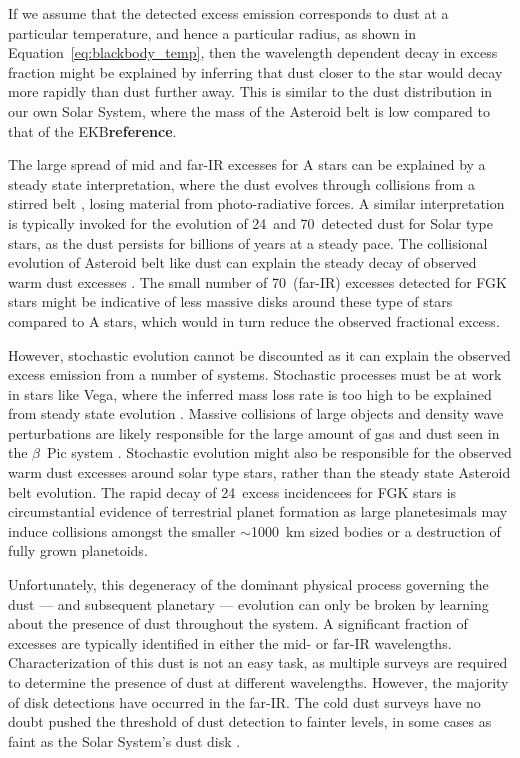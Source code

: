     If we assume that the detected excess emission corresponds to dust at a particular temperature, and hence a particular radius, as shown in Equation~\ref{eq:blackbody_temp}, then the wavelength dependent decay in excess fraction might be explained by inferring that dust closer to the star would decay more rapidly than dust further away. This is similar to the dust distribution in our own Solar System, where the mass of the Asteroid belt is low compared to that of the EKB\textbf{reference}. 
    
    The large spread of mid and far-IR excesses for A stars can be explained by a steady state interpretation, where the dust evolves through collisions from a stirred belt \citep{Su2006, Wyatt2008}, losing material from photo-radiative forces. A similar interpretation is typically invoked for the evolution of 24\micron\ and 70\micron\ detected dust for Solar type stars, as the dust persists for billions of years at a steady pace. The collisional evolution of Asteroid belt like dust can explain the steady decay of observed warm dust excesses \citep{Wyatt2008}. The small number of 70\micron\ (far-IR) excesses detected for FGK stars might be indicative of less massive disks around these type of stars compared to A stars, which would in turn reduce the observed fractional excess\citep{Wyatt2008}. 
    
    However, stochastic evolution cannot be discounted as it can explain the observed excess emission from a number of systems. Stochastic processes must be at work in stars like Vega, where the inferred mass loss rate is too high to be explained from steady state evolution \citep{Su2006}. Massive collisions of large objects and density wave perturbations are likely responsible for the large amount of gas and dust seen in the $\beta$~Pic system \citep{Telesco2005, Nesvold2015}. Stochastic  evolution might also be responsible for the observed warm dust excesses around solar type stars, rather than the steady state Asteroid belt evolution. The rapid decay of 24\micron\ excess incidencees for FGK stars is circumstantial evidence of terrestrial planet formation as large planetesimals may induce collisions amongst the smaller $\sim$1000~km sized bodies or a destruction of fully grown planetoids\citep{Meyer2008, Wyatt2008}. 
    
    
    Unfortunately, this degeneracy of the dominant physical process governing the dust --- and subsequent planetary --- evolution can only be broken by learning about the presence of dust throughout the system. A significant fraction of excesses are typically identified in either the mid- or far-IR wavelengths. Characterization of this dust is not an easy task, as multiple surveys are required to determine the presence of dust at different wavelengths. However, the majority of disk detections have occurred in the far-IR. The cold dust surveys have no doubt pushed the threshold of dust detection to fainter levels, in some cases as faint as the Solar System's dust disk \citep{Matthews2013}. 
    
